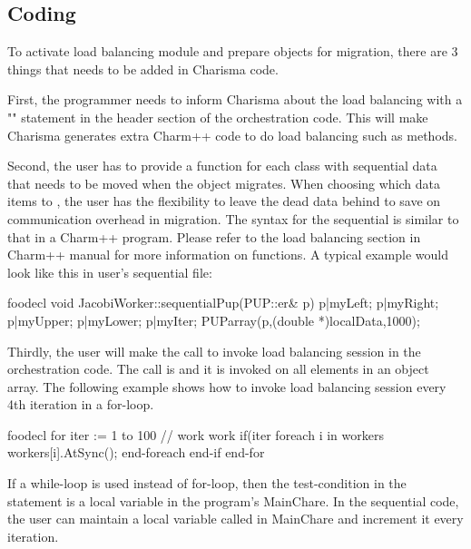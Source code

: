 \subsection{Coding}

To activate load balancing module and prepare objects for migration, there are 3
things that needs to be added in Charisma code. 

First, the programmer needs to inform Charisma about the load balancing with a
"" statement in the header section of the orchestration code.
This will make Charisma generates extra Charm++ code to do load balancing such
as  methods.

Second, the user has to provide a  function for each class with
sequential data that needs to be moved when the object migrates. When choosing
which data items to , the user has the flexibility to leave the dead
data behind to save on communication overhead in migration. The syntax for the
sequential  is similar to that in a Charm++ program. Please refer to
the load balancing section in Charm++ manual for more information on 
functions. A typical example would look like this in user's sequential 
file: 

\begin{SaveVerbatim}{foodecl}
  void JacobiWorker::sequentialPup(PUP::er& p){
    p|myLeft; p|myRight; p|myUpper; p|myLower;
    p|myIter;
    PUParray(p,(double *)localData,1000);
  }
\end{SaveVerbatim}
\vspace{0.1in}
\vspace{0.1in}

Thirdly, the user will make the call to invoke load balancing session in the
orchestration code. The call is  and it is invoked on all
elements in an object array. The following example shows how to invoke load
balancing session every 4th iteration in a for-loop. 

\begin{SaveVerbatim}{foodecl}
  for iter := 1 to 100
    // work work
    if(iter %
      foreach i in workers
        workers[i].AtSync();
      end-foreach
    end-if
  end-for
\end{SaveVerbatim}
\vspace{0.1in}
\vspace{0.1in}

If a while-loop is used instead of for-loop, then the test-condition in the
 statement is a local variable in the program's MainChare. In the
sequential code, the user can maintain a local variable called  in
MainChare and increment it every iteration. 


